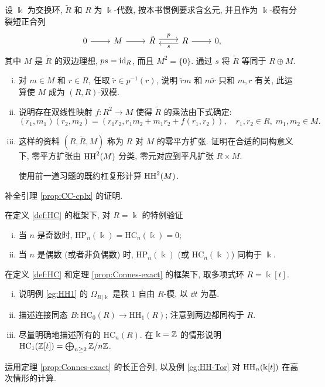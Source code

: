\begin{Exercises}
	\item 设 $\Bbbk$ 为交换环, $\tilde{R}$ 和 $R$ 为 $\Bbbk$-代数, 按本书惯例要求含幺元, 并且作为 $\Bbbk$-模有分裂短正合列
	\[\begin{tikzcd}
		0 \arrow[r] & M \arrow[r] & \tilde{R} \arrow[shift left, r, "p"] & R \arrow[r] \arrow[shift left, l, "s"] & 0,
	\end{tikzcd}\]
	其中 $M$ 是 $\tilde{R}$ 的双边理想, $ps = \mathrm{id}_R$, 而且 $M^2 = \{0\}$. 通过 $s$ 将 $\tilde{R}$ 等同于 $R \oplus M$.
	\begin{enumerate}[(i)]
		\item 对 $m \in M$ 和 $r \in R$, 任取 $\tilde{r} \in p^{-1}(r)$, 说明 $\tilde{r}m$ 和 $m\tilde{r}$ 只和 $m, r$ 有关, 此运算使 $M$ 成为 $(R,R)$-双模.
		\item 说明存在双线性映射 $f: R^2 \to M$ 使得 $\tilde{R}$ 的乘法由下式确定:
		\[ (r_1, m_1)(r_2, m_2) = (r_1 r_2, r_1 m_2 + m_1 r_2 + f(r_1, r_2)), \quad r_1, r_2 \in R, \; m_1, m_2 \in M. \]
		\item 这样的资料 $(R, \tilde{R}, M)$ 称为 $R$ 对 $M$ 的零平方扩张. 证明在合适的同构意义下, 零平方扩张由 $\operatorname{HH}^2(M)$ 分类, 零元对应到平凡扩张 $R \times M$.
		\begin{hint}
			使用前一道习题的既约杠复形计算 $\operatorname{HH}^2(M)$.
		\end{hint}
	\end{enumerate}

	\item 补全引理 \ref{prop:CC-cplx} 的证明.

	\item 在定义 \ref{def:HC} 的框架下, 对 $R = \Bbbk$ 的特例验证
	\begin{enumerate}[(i)]
		\item 当 $n$ 是奇数时, $\mathrm{HP}_n(\Bbbk) = \mathrm{HC}_n(\Bbbk) = 0$;
		\item 当 $n$ 是偶数 (或者非负偶数) 时, $\mathrm{HP}_n(\Bbbk)$ (或 $\mathrm{HC}_n(\Bbbk)$) 同构于 $\Bbbk$.
	\end{enumerate}

	\item 在定义 \ref{def:HC} 和定理 \ref{prop:Connes-exact} 的框架下, 取多项式环 $R = \Bbbk[t]$.
	\begin{enumerate}[(i)]
		\item 说明例 \ref{eg:HH1} 的 $\Omega_{R|\Bbbk}$ 是秩 $1$ 自由 $R$-模, 以 $\dd t$ 为基.
		\item 描述连接同态 $B: \mathrm{HC}_0(R) \to \mathrm{HH}_1(R)$; 注意到两边都同构于 $R$.
		\item 尽量明确地描述所有的 $\mathrm{HC}_n(R)$. 在 $\Bbbk = \mathbb{Z}$ 的情形说明 $\mathrm{HC}_1(\mathbb{Z}[t]) = \bigoplus_{n \geq 2} \mathbb{Z}/n\mathbb{Z}$.
	\end{enumerate}
	\begin{hint}
		运用定理 \ref{prop:Connes-exact} 的长正合列, 以及例 \ref{eg:HH-Tor} 对 $\operatorname{HH}_n(\Bbbk[t])$ 在高次情形的计算.
	\end{hint}


\end{Exercises}
